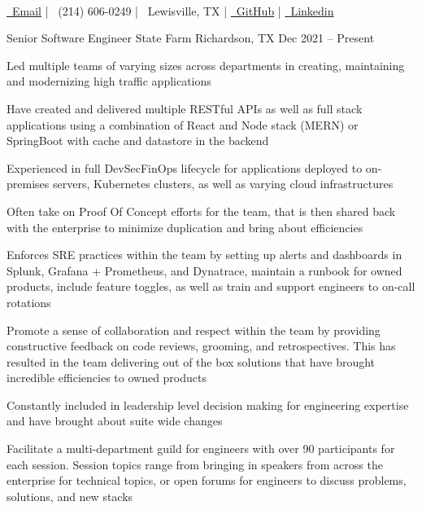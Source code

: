 \documentclass[]{awesome-cv}
\begin{document}
    
\begin{center}
	 \\
	\vspace{1mm}
	\href {mailto:laluvjohn@gmail.com} {\faEnvelope\ Email} | {\faMobile\ (214) 606-0249} | {\faMapMarker\ Lewisville, TX} |  \href {https://github.com/laluvjohntx} {\faGithubSquare\ GitHub} |  \href {https://www.linkedin.com/in/lalu-john-9957438b/} {\faLinkedinSquare\ Linkedin}
\end{center}
\begin{cventries}
	\cventry
	{Senior Software Engineer}
	{State Farm}
	{Richardson, TX}
	{Dec 2021 – Present}
	{
		\begin{cvitems}
		\item {Led multiple teams of varying sizes across departments in creating, maintaining and modernizing high traffic applications}
		\item {Have created and delivered multiple RESTful APIs as well as full stack applications using a combination of   React and Node stack (MERN)  or SpringBoot with cache and datastore in the backend}
		\item {Experienced in full DevSecFinOps lifecycle for applications deployed to on-premises servers, Kubernetes clusters, as well as varying cloud infrastructures}
		\item {Often take on Proof Of Concept efforts for the team, that is then shared back with the enterprise to minimize duplication and bring about efficiencies} 
		\item {Enforces SRE practices within the team by setting up alerts and dashboards in Splunk, Grafana + Prometheus, and Dynatrace, maintain a runbook for owned products, include feature toggles, as well as train and support engineers to on-call rotations }
		\item {Promote a sense of collaboration and respect within the team by providing constructive feedback on code reviews, grooming, and retrospectives. This has resulted in the team delivering out of the box solutions that have brought incredible efficiencies to owned products }
		\item {Constantly included in leadership level decision making for engineering expertise and have brought about suite wide changes}
		\item {Facilitate a multi-department guild for engineers with over 90 participants for each session. Session topics range from bringing in speakers from across the enterprise for technical topics, or open forums for engineers to discuss problems, solutions, and new stacks}

\end{cvitems}}
\end{cventries}
\end{document}
